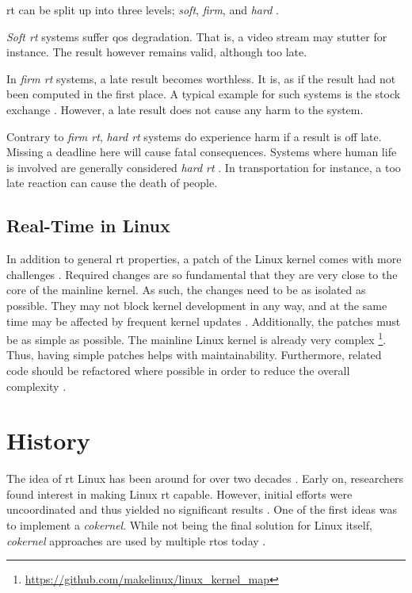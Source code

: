 \documentclass[10pt,twocolumn,a4paper]{article}
\begin{document}
\acrshort{rt} can be split up into three levels; \emph{soft}, \emph{firm}, and \emph{hard} \cite{buttazzo_hard_1997}.

\emph{Soft \acrshort{rt}} systems suffer \acrfull{qos} degradation.
That is, a video stream may stutter for instance.
The result however remains valid, although too late.

In \emph{firm \acrshort{rt}} systems, a late result becomes worthless.
It is, as if the result had not been computed in the first place.
A typical example for such systems is the stock exchange \cite{reghenzani_realtime_2019}.
However, a late result does not cause any harm to the system.

Contrary to \emph{firm \acrshort{rt}}, \emph{hard \acrshort{rt}} systems do experience harm if a result is off late.
Missing a deadline here will cause fatal consequences.
Systems where human life is involved are generally considered \emph{hard \acrshort{rt}} \cite{reghenzani_realtime_2019}.
In transportation for instance, a too late reaction can cause the death of people.

\subsection{Real-Time in Linux}
In addition to general \acrshort{rt} properties, a patch of the Linux kernel comes with more challenges \cite{jason_perlow_trenches_2021}.
Required changes are so fundamental that they are very close to the core of the mainline kernel.
As such, the changes need to be as isolated as possible.
They may not block kernel development in any way, and at the same time may be affected by frequent kernel updates \cite{jason_perlow_trenches_2021}.
Additionally, the patches must be as simple as possible.
The mainline Linux kernel is already very complex \footnote{\url{https://github.com/makelinux/linux_kernel_map}}.
Thus, having simple patches helps with maintainability.
Furthermore, related code should be refactored where possible in order to reduce the overall complexity \cite{jason_perlow_trenches_2021}.


\section{History}
The idea of \acrshort{rt} Linux has been around for over two decades \cite{casimiro_how_2000}.
Early on, researchers found interest in making Linux \acrshort{rt} capable.
However, initial efforts were uncoordinated and thus yielded no significant results \cite{jason_perlow_trenches_2021}.
One of the first ideas was to implement a \emph{cokernel}.
While not being the final solution for Linux itself, \emph{cokernel} approaches are used by multiple \acrshort{rtos} today \cite{reghenzani_realtime_2019}.
\end{document}
